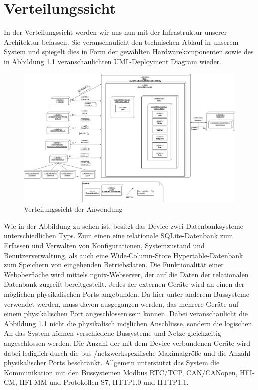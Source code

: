 \chapter{Verteilungssicht}
\label{ch:Verteilungssicht}
In der Verteilungssicht werden wir uns nun mit der Infrastruktur unserer Architektur befassen. Sie veranschaulicht den technischen Ablauf in unserem System und spiegelt dies in Form der gewählten Hardwarekomponenten sowie des in Abbildung \ref{fig:verteilung} veranschaulichten UML-Deployment Diagram wieder.

\begin{figure}[h]
	\centering
	\includegraphics[width=1.1\textwidth]{Graphics/verteiler.png}
	\caption{Verteilungssicht der Anwendung}
	\label{fig:verteilung}
\end{figure}

Wie in der Abbildung zu sehen ist, besitzt das Device zwei Datenbanksysteme unterschiedlichen Typs. Zum einen eine relationale SQLite-Datenbank zum Erfassen und Verwalten von Konfigurationen, Systemzustand und Benutzerverwaltung, als auch eine Wide-Column-Store Hypertable-Datenbank zum Speichern von eingehenden Betriebsdaten.
Die Funktionalität einer Weboberfläche wird mittels ngnix-Webserver, der auf die Daten der relationalen Datenbank zugreift bereitgestellt. Jedes der externen Geräte wird an einen der möglichen physikalischen Ports angebunden. Da hier unter anderem Bussysteme verwendet werden, muss davon ausgegangen werden, das mehrere Geräte auf einem physikalischen Port angeschlossen sein können. Dabei veranschaulicht die Abbildung \ref{fig:verteilung} nicht die physikalisch möglichen Anschlüsse, sondern die logischen. An das System können verschiedene Bussysteme und Netze gleichzeitig angeschlossen werden. Die Anzahl der mit dem Device verbundenen Geräte wird dabei lediglich durch die bus-/netzwerkspezifische Maximalgröße und die Anzahl physikalischer Ports beschränkt. Allgemein unterstützt das System die Kommunikation mit den Bussystemen Modbus RTC/TCP, CAN/CANopen, HFI-CM, HFI-MM und Protokollen S7, HTTP1.0 und HTTP1.1.  